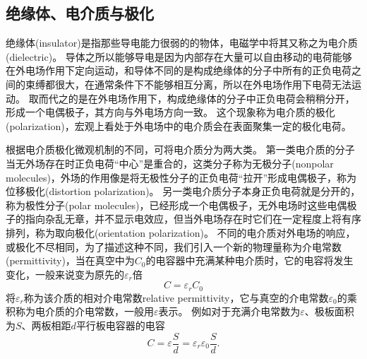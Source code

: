 \subsection{绝缘体、电介质与极化}

{\heiti 绝缘体}(insulator)是指那些导电能力很弱的的物体，电磁学中将其又称之为{\heiti 电介质}(dielectric)。
导体之所以能够导电是因为内部存在大量可以自由移动的电荷能够在外电场作用下定向运动，和导体不同的是构成绝缘体的分子中所有的正负电荷之间的束缚都很大，在通常条件下不能够相互分离，所以在外电场作用下电荷无法运动。
取而代之的是在外电场作用下，构成绝缘体的分子中正负电荷会稍稍分开，形成一个电偶极子，其方向与外电场方向一致。
这个现象称为电介质的{\heiti 极化}(polarization)，宏观上看处于外电场中的电介质会在表面聚集一定的极化电荷。

根据电介质极化微观机制的不同，可将电介质分为两大类。
第一类电介质的分子当无外场存在时正负电荷“中心”是重合的，这类分子称为{\heiti 无极分子}(nonpolar molecules)，外场的作用像是将无极性分子的正负电荷“拉开”形成电偶极子，称为{\heiti 位移极化}(distortion polarization)。
另一类电介质分子本身正负电荷就是分开的，称为{\heiti 极性分子}(polar molecules)，已经形成一个电偶极子，无外电场时这些电偶极子的指向杂乱无章，并不显示电效应，但当外电场存在时它们在一定程度上将有序排列，称为{\heiti 取向极化}(orientation polarization)。
不同的电介质对外电场的响应，或极化不尽相同，为了描述这种不同，我们引入一个新的物理量称为{\heiti 介电常数}(permittivity)，当在真空中为$C_0$的电容器中充满某种电介质时，它的电容将发生变化，一般来说变为原先的$\varepsilon_r$倍
\begin{equation}
C = \varepsilon_r C_0
\end{equation}
将$\varepsilon_r$称为该介质的{\heiti 相对介电常数}{relative permittivity}，它与真空的介电常数$\varepsilon_0$的乘积称为电介质的介电常数，一般用$\varepsilon$表示。
例如对于充满介电常数为$\varepsilon$、极板面积为$S$、两板相距$d$平行板电容器的电容
\begin{equation}
C = \varepsilon\frac{S}{d} = \varepsilon_r\varepsilon_0\frac{S}{d}.
\end{equation}


